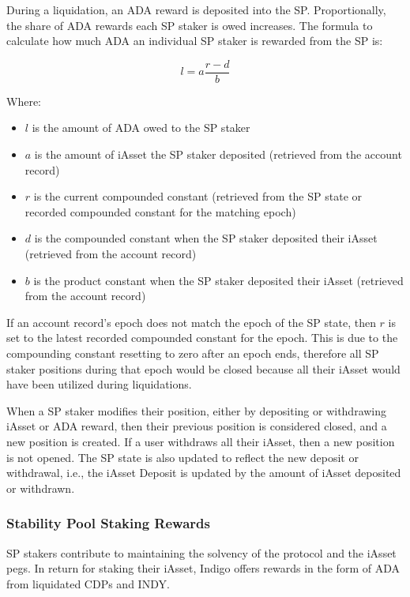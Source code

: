 \documentclass{article}
\begin{document}
\begin{sloppypar}
During a liquidation, an ADA reward is deposited into the SP.
Proportionally, the share of ADA rewards each SP staker is owed
increases. The formula to calculate how much ADA an individual SP staker
is rewarded from the SP is:

\[l = a\frac{r - d}{b}\]

Where:

\begin{itemize}
\item
  \(l\) is the amount of ADA owed to the SP staker
\item
  \(a\) is the amount of iAsset the SP staker deposited (retrieved from
  the account record)
\item
  \(r\) is the current compounded constant (retrieved from the SP state
  or recorded compounded constant for the matching epoch)
\item
  \(d\) is the compounded constant when the SP staker deposited their
  iAsset (retrieved from the account record)
\item
  \(b\) is the product constant when the SP staker deposited their
  iAsset (retrieved from the account record)
\end{itemize}

If an account record's epoch does not match the epoch of the SP state,
then \(r\) is set to the latest recorded compounded constant for the
epoch. This is due to the compounding constant resetting to zero after
an epoch ends, therefore all SP staker positions during that epoch would
be closed because all their iAsset would have been utilized during
liquidations.

When a SP staker modifies their position, either by depositing or
withdrawing iAsset or ADA reward, then their previous position is
considered closed, and a new position is created. If a user withdraws
all their iAsset, then a new position is not opened. The SP state is
also updated to reflect the new deposit or withdrawal, i.e., the iAsset
Deposit is updated by the amount of iAsset deposited or withdrawn.

\hypertarget{stability-pool-staking-rewards}{%
\subsubsection{Stability Pool Staking
Rewards}\label{stability-pool-staking-rewards}}

SP stakers contribute to maintaining the solvency of the protocol and
the iAsset pegs. In return for staking their iAsset, Indigo offers
rewards in the form of ADA from liquidated CDPs and INDY.


\end{sloppypar}
\end{document}
